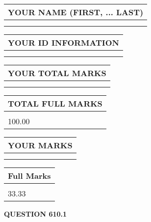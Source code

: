 \documentclass{ctexart}
\begin{document}
   
   
   
\newpage 
\setcounter{page}{ 
   610001 } 
   
   
   
   
\noindent\begin{tabular}{|l|}
\hline
YOUR NAME (FIRST, ... LAST)  \\
\hline
 \\ 
 \\ 
\hline
\end{tabular}
\hspace{0.05in} \begin{tabular}{|l|}
\hline
 YOUR   ID   INFORMATION  \\
\hline
 \\ 
 \\ 
\hline
\end{tabular}
   
   
\vspace{0.2in}\noindent\begin{tabular}{|l|}
\hline
YOUR TOTAL MARKS  \\
\hline
 \\ 
 \\ 
\hline
\end{tabular}
\hspace{0.05in} \begin{tabular}{|l|}
\hline
TOTAL FULL MARKS  \\
\hline
 \\ 
100.00 \\
\hline
\end{tabular}
   
   
 \vspace{0.2in}
 
 
 
 
   
   
  
\vspace{0.2in}
  
\noindent\begin{tabular}{|l|}
\hline
 YOUR MARKS  \\
\hline
 \\ 
 \\ 
\hline
\end{tabular}
\hspace{0.05in} \begin{tabular}{|l|}
\hline
 Full Marks  \\
\hline
 \\ 
33.33 \\
\hline
\end{tabular}
{\textbf{\Large{QUESTION
610.1 
}}}
  
\end{document}

